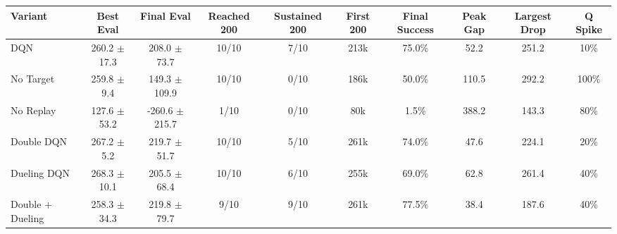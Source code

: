 \begin{adjustbox}{width=\textwidth}
\begin{tabular}{@{}lccccccccc@{}}
\toprule
\textbf{Variant} & \textbf{Best Eval} & \textbf{Final Eval} & \textbf{Reached 200} & \textbf{Sustained 200} & \textbf{First 200} & \textbf{Final Success} & \textbf{Peak Gap} & \textbf{Largest Drop} & \textbf{Q Spike} \\
\midrule
DQN & 260.2 $\pm$ 17.3 & 208.0 $\pm$ 73.7 & 10/10 & 7/10 & 213k & 75.0\% & 52.2 & 251.2 & 10\% \\
No Target & 259.8 $\pm$ 9.4 & 149.3 $\pm$ 109.9 & 10/10 & 0/10 & 186k & 50.0\% & 110.5 & 292.2 & 100\% \\
No Replay & 127.6 $\pm$ 53.2 & -260.6 $\pm$ 215.7 & 1/10 & 0/10 & 80k & 1.5\% & 388.2 & 143.3 & 80\% \\
Double DQN & 267.2 $\pm$ 5.2 & 219.7 $\pm$ 51.7 & 10/10 & 5/10 & 261k & 74.0\% & 47.6 & 224.1 & 20\% \\
Dueling DQN & 268.3 $\pm$ 10.1 & 205.5 $\pm$ 68.4 & 10/10 & 6/10 & 255k & 69.0\% & 62.8 & 261.4 & 40\% \\
Double + Dueling & 258.3 $\pm$ 34.3 & 219.8 $\pm$ 79.7 & 9/10 & 9/10 & 261k & 77.5\% & 38.4 & 187.6 & 40\% \\
\bottomrule
\end{tabular}
\end{adjustbox}
